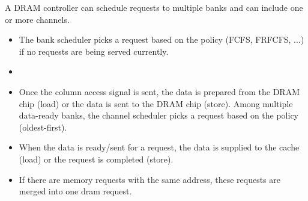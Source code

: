   A DRAM controller can schedule requests to multiple banks and can include one
  or more channels. 

\begin{itemize}
  \item The bank scheduler picks a request based on the policy (FCFS,
  FRFCFS, ...) if no requests are being served currently.

  \item {}

  \item Once the column access signal is sent, the data is prepared
  from the DRAM chip (load) or the data is sent to the DRAM chip
  (store). Among multiple data-ready banks, the channel scheduler
  picks a request based on the policy (oldest-first).

  \item When the data is ready/sent for a request, the data is
  supplied to the cache (load) or the request is completed (store).

  \item If there are memory requests with the same address, these
  requests are merged into one dram request. 

\end{itemize}



